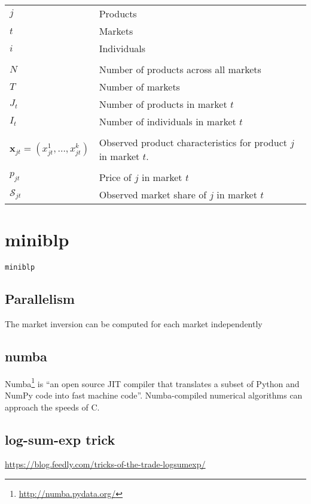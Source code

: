 \documentclass[parskip=half]{scrartcl}
\newcommand{\code}[1]{\texttt{#1}}
\begin{document}
\begin{tabular}{l l}
	\(j\) & Products \\
	\(t\) & Markets \\
	\(i\) & Individuals \\
	\\
	\(N\) & Number of products across all markets \\
	\(T\) & Number of markets \\
	\(J_t\) & Number of products in market \(t\) \\
	\(I_t\) & Number of individuals in market \(t\) \\
	\\
	\(\boldsymbol{x}_{jt} = (x^1_{jt}, \dotsc, x^k_{jt})\) & Observed product characteristics for product \(j\) in market \(t\). \\
	\\
	\(p_{jt}\) & Price of \(j\) in market \(t\) \\
	$\mathcal{S}_{jt}$ & Observed market share of \(j\) in market \(t\)
	
\end{tabular}

\section{miniblp}

\code{miniblp}

\subsection{Parallelism}

The market inversion can be computed for each market independently

\subsection{numba}

Numba\footnote{\url{http://numba.pydata.org/}} is ``an open source JIT compiler that translates a subset of Python and NumPy code into fast machine code''. Numba-compiled numerical algorithms can approach the speeds of C.

\subsection{log-sum-exp trick}

\url{https://blog.feedly.com/tricks-of-the-trade-logsumexp/}
\end{document}
